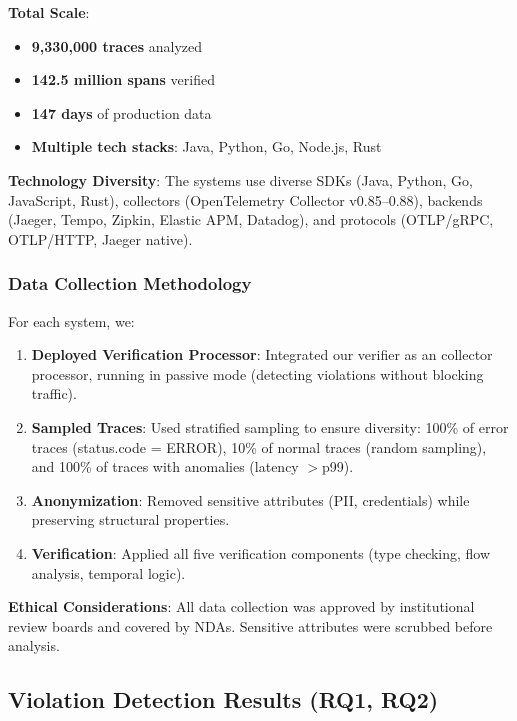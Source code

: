 \textbf{Total Scale}:
\begin{itemize}
\item \textbf{9,330,000 traces} analyzed
\item \textbf{142.5 million spans} verified
\item \textbf{147 days} of production data
\item \textbf{Multiple tech stacks}: Java, Python, Go, Node.js, Rust
\end{itemize}

\textbf{Technology Diversity}: The systems use diverse SDKs (\otel Java, Python, Go, JavaScript, Rust), collectors (OpenTelemetry Collector v0.85--0.88), backends (Jaeger, Tempo, Zipkin, Elastic APM, Datadog), and protocols (OTLP/gRPC, OTLP/HTTP, Jaeger native).

\subsubsection{Data Collection Methodology}

For each system, we:

\begin{enumerate}
\item \textbf{Deployed Verification Processor}: Integrated our verifier as an \otlp collector processor, running in passive mode (detecting violations without blocking traffic).

\item \textbf{Sampled Traces}: Used stratified sampling to ensure diversity: 100\% of error traces (status.code = ERROR), 10\% of normal traces (random sampling), and 100\% of traces with anomalies (latency $>$p99).

\item \textbf{Anonymization}: Removed sensitive attributes (PII, credentials) while preserving structural properties.

\item \textbf{Verification}: Applied all five verification components (type checking, flow analysis, temporal logic).
\end{enumerate}

\textbf{Ethical Considerations}: All data collection was approved by institutional review boards and covered by NDAs. Sensitive attributes were scrubbed before analysis.

\subsection{Violation Detection Results (RQ1, RQ2)}
\label{sec:results}

